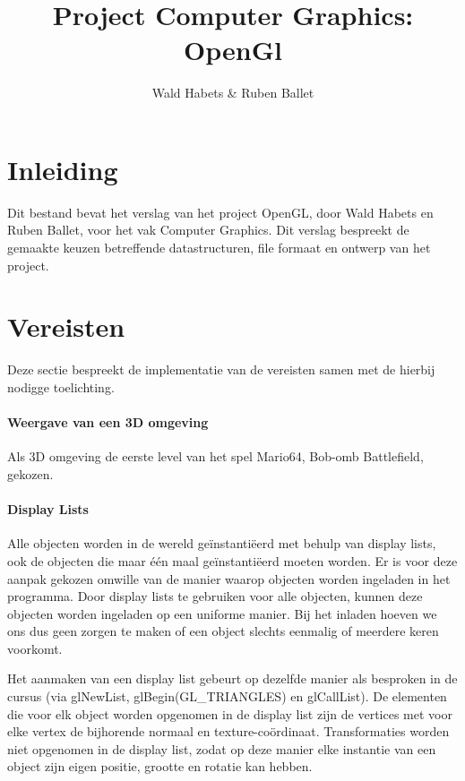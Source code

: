 \documentclass{article}
\begin{document}
\title{Project Computer Graphics: OpenGl}
\author{Wald Habets \& Ruben Ballet}
\maketitle

\section{Inleiding}
\par
Dit bestand bevat het verslag van het project OpenGL, door Wald Habets en Ruben Ballet, voor het vak Computer Graphics. Dit verslag bespreekt de gemaakte keuzen betreffende datastructuren, file formaat en ontwerp van het project.

\section{Vereisten}

Deze sectie bespreekt de implementatie van de vereisten samen met de hierbij nodigge toelichting.

\paragraph{Weergave van een 3D omgeving}Als 3D omgeving de eerste level van het spel Mario64, Bob-omb Battlefield, gekozen.

\paragraph{Display Lists}Alle objecten worden in de wereld geïnstantiëerd met behulp van display lists, ook de objecten die maar één maal geïnstantiëerd moeten worden. Er is voor deze aanpak gekozen omwille van de manier waarop objecten worden ingeladen in het programma. Door display lists te gebruiken voor alle objecten, kunnen deze objecten worden ingeladen op een uniforme manier. Bij het inladen hoeven we ons dus geen zorgen te maken of een object slechts eenmalig of meerdere keren voorkomt.
\par
Het aanmaken van een display list gebeurt op dezelfde manier als besproken in de cursus (via glNewList, glBegin(GL\_TRIANGLES) en glCallList). De elementen die voor elk object worden opgenomen in de display list zijn de vertices met voor elke vertex de bijhorende normaal en texture-coördinaat. Transformaties worden niet opgenomen in de display list, zodat op deze manier elke instantie van een object zijn eigen positie, grootte en rotatie kan hebben.
\end{document}
